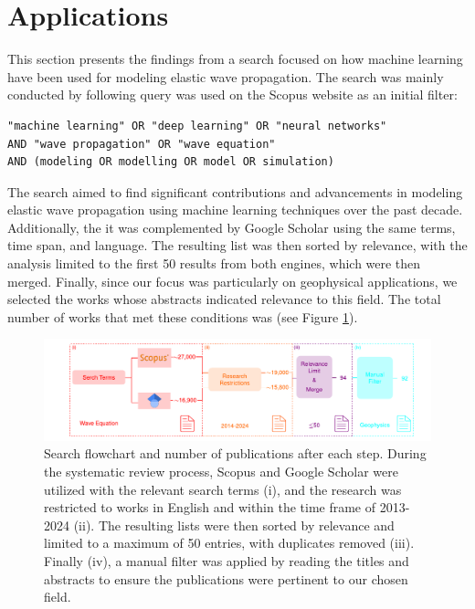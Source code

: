 \documentclass[11pt,twoside]{article}
\begin{document}
\section{Applications}

This section presents the findings from a search focused on how machine learning have been used for modeling elastic wave propagation. 
The search was mainly conducted by following query was used on the Scopus website as an initial filter:

\begin{verbatim}
"machine learning" OR "deep learning" OR "neural networks" 
AND "wave propagation" OR "wave equation" 
AND (modeling OR modelling OR model OR simulation)
\end{verbatim}

The search aimed to find significant contributions and advancements in modeling elastic wave propagation using machine learning techniques 
over the past decade. Additionally, the it was complemented by Google Scholar using the same terms, time span, and language. The resulting 
list was then sorted by relevance, with the analysis limited to the first 50 results from both engines, which were then merged. Finally, since 
our focus was particularly on geophysical applications, we selected the works whose abstracts indicated relevance to this field. The total 
number of works that met these conditions was  (see Figure \ref{fig:Escheme_Systematic_Review}).

\begin{figure}[H]
    \includegraphics[width=1.0\textwidth]{figs/Escheme_Systematic_Review.pdf}
\caption{Search flowchart and number of publications after each step. During the systematic review process, Scopus and Google Scholar were 
utilized with the relevant search terms (i), and the research was restricted to works in English and within the time frame of 2013-2024 (ii). 
The resulting lists were then sorted by relevance and limited to a maximum of 50 entries, with duplicates removed (iii). Finally (iv), a 
manual filter was applied by reading the titles and abstracts to ensure the publications were pertinent to our chosen field.}
    \label{fig:Escheme_Systematic_Review}
\end{figure}
\end{document}
